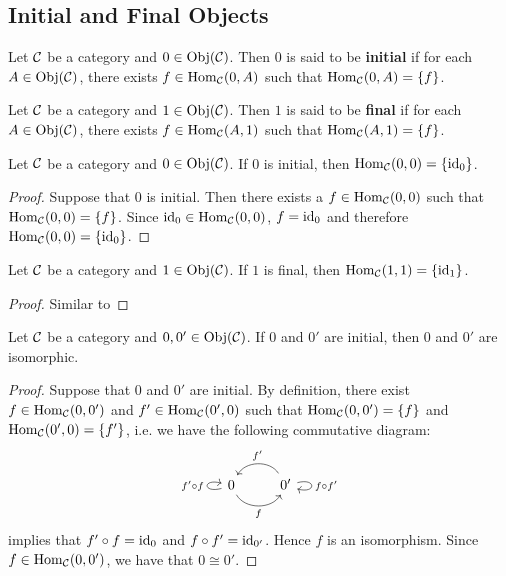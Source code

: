 \documentclass{book}
\begin{document}
	\subsection{Initial and Final Objects}
	
	\begin{defn} 
		Let $\mathcal{C}$ be a category and $0 \in \operatorname{Obj}(\mathcal{C})$. Then $0$ is said to be \textbf{initial} if for each $A \in \operatorname{Obj}(\mathcal{C})$, there exists $f \in \operatorname{Hom}_{\mathcal{C}}(0, A)$ such that $\operatorname{Hom}_{\mathcal{C}}(0, A) = \{f\}$. 
	\end{defn}

	\begin{defn} 
		Let $\mathcal{C}$ be a category and $1 \in \operatorname{Obj}(\mathcal{C})$. Then $1$ is said to be \textbf{final} if for each $A \in \operatorname{Obj}(\mathcal{C})$, there exists $f \in \operatorname{Hom}_{\mathcal{C}}(A, 1)$ such that $\operatorname{Hom}_{\mathcal{C}}(A, 1) = \{f\}$. 
	\end{defn}
	
	\begin{ex} 
		Let $\mathcal{C}$ be a category and $0 \in \operatorname{Obj}(\mathcal{C})$. If $0$ is initial, then $\operatorname{Hom}_{\mathcal{C}}(0, 0) = \{\operatorname{id}_0\}$.
	\end{ex}
	
	\begin{proof}
		Suppose that $0$ is initial. Then there exists a $f \in \operatorname{Hom}_{\mathcal{C}}(0,0)$ such that $\operatorname{Hom}_{\mathcal{C}}(0, 0) = \{f\}$. Since $\operatorname{id}_0 \in \operatorname{Hom}_{\mathcal{C}}(0,0)$, $f = \operatorname{id}_0$ and therefore $\operatorname{Hom}_{\mathcal{C}}(0, 0) = \{\operatorname{id}_0\}$.
	\end{proof}

		\begin{ex} 
		Let $\mathcal{C}$ be a category and $1 \in \operatorname{Obj}(\mathcal{C})$. If $1$ is final, then $\operatorname{Hom}_{\mathcal{C}}(1, 1) = \{\operatorname{id}_1\}$.
	\end{ex}
	
	\begin{proof}
		Similar to 
	\end{proof}
	
	\begin{ex} 
		Let $\mathcal{C}$ be a category and $0, 0' \in \operatorname{Obj}(\mathcal{C})$. If $0$ and $0'$ are initial, then $0$ and $0'$ are isomorphic.
	\end{ex}
	
	\begin{proof}
		Suppose that $0$ and $0'$ are initial. By definition, there exist $f \in \operatorname{Hom}_{\mathcal{C}}(0, 0')$ and $f' \in \operatorname{Hom}_{\mathcal{C}}(0', 0)$ such that $\operatorname{Hom}_{\mathcal{C}}(0, 0') = \{f\}$ and $\operatorname{Hom}_{\mathcal{C}}(0', 0) = \{f'\}$, i.e. we have the following commutative diagram:
		\[ 
		\begin{tikzcd}[baseline= 7]
			\arrow[loop left, "f' \circ f"] 0 \arrow[r, bend right= 60, "f", swap] & 0' \arrow[l, bend left=-60, "f'", swap] \arrow[loop right, "f \circ f'"] \\
		\end{tikzcd}
		\]
		 implies that $f' \circ f = \operatorname{id}_{0}$ and $f \circ f' = \operatorname{id}_{0'}$. Hence $f$ is an isomorphism. Since $f \in \operatorname{Hom}_{\mathcal{C}}(0, 0')$, we have that $0 \cong 0'$.
	\end{proof}
\end{document}
